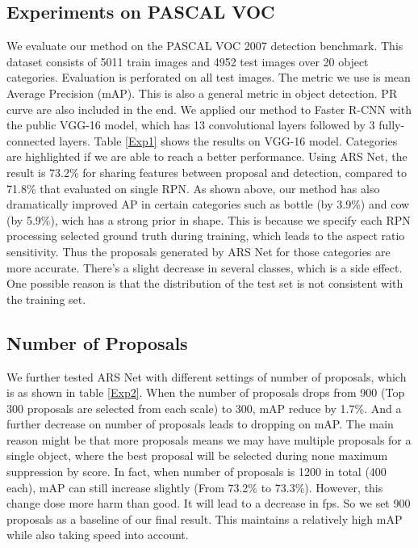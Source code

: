 \documentclass[10pt,twocolumn,letterpaper]{article}
\begin{document}
\subsection{Experiments on PASCAL VOC}
We evaluate our method on the PASCAL VOC 2007 detection benchmark. This dataset consists of 5011 train images and 4952 test images over 20 object categories. Evaluation is perforated on all test images. The metric we use is mean Average Precision (mAP). This is also a general metric in object detection. PR curve are also included in the end.
\indent{}We applied our method to Faster R-CNN with the public VGG-16 model, which has 13 convolutional layers followed by 3 fully-connected layers. Table \ref{Exp1} shows the results on VGG-16 model. Categories are highlighted if we are able to reach a better performance. Using ARS Net, the result is 73.2\% for sharing features between proposal and detection, compared to 71.8\% that evaluated on single RPN. As shown above, our method has also dramatically improved AP in certain categories such as bottle (by 3.9\%) and cow (by 5.9\%), wich has a strong prior in shape. This is because we specify each RPN processing selected ground truth during training, which leads to the aspect ratio sensitivity. Thus the proposals generated by ARS Net for those categories are more accurate. There's a slight decrease in several classes, which is a side effect. One possible reason is that the distribution of the test set is not consistent with the training set.

\subsection{Number of Proposals}
We further tested ARS Net with different settings of number of proposals, which is as shown in table \ref{Exp2}. When the number of proposals drops from 900 (Top 300 proposals are selected from each scale) to 300, mAP reduce by 1.7\%. And a further decrease on number of proposals leads to dropping on mAP. The main reason might be that more proposals means we may have multiple proposals for a single object, where the best proposal will be selected during none maximum suppression by score. In fact, when number of proposals is 1200 in total (400 each), mAP can still increase slightly (From 73.2\% to 73.3\%). However, this change dose more harm than good. It will lead to a decrease in fps. So we set 900 proposals as a baseline of our final result. This maintains a relatively high mAP while also taking speed into account.
\end{document}
